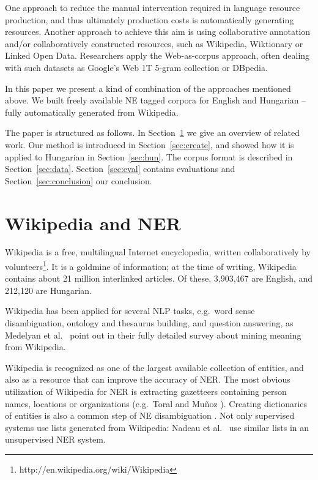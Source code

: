 \documentclass[11pt]{article}
\begin{document}
One approach to reduce the manual intervention required in language resource production, and thus ultimately production costs is automatically generating resources. Another approach to achieve this aim is using collaborative annotation and/or collaboratively constructed resources, such as Wikipedia, Wiktionary or Linked Open Data. Researchers apply the Web-as-corpus approach, often dealing with such datasets as Google's Web 1T 5-gram collection or DBpedia.  


In this paper we present a kind of combination of the approaches mentioned above. We built freely available NE tagged corpora for English and Hungarian -- fully automatically generated from Wikipedia. %

The paper is structured as follows. In Section~\ref{sec:related} we give an overview of related work. Our method is introduced in Section~\ref{sec:create}, and showed how it is applied to Hungarian in Section~\ref{sec:hun}. The corpus format is described in Section~\ref{sec:data}. Section~\ref{sec:eval} contains evaluations and Section~\ref{sec:conclusion} our conclusion.

\section{Wikipedia and NER}
\label{sec:related}

Wikipedia is a free, multilingual Internet encyclopedia, written collaboratively by volunteers\footnote{http://en.wikipedia.org/wiki/Wikipedia}. It is a goldmine of information; at the time of writing, Wikipedia contains about 21 million interlinked articles. Of these, 3,903,467 are English, and 212,120 are Hungarian. 

Wikipedia has been applied for several NLP tasks, e.g.~word sense disambiguation, ontology and thesaurus building, and question answering, as Medelyan et al.~ point out in their fully detailed survey about mining meaning from Wikipedia. 

Wikipedia is recognized as one of the largest available collection of entities, and also as a resource that can improve the accuracy of NER. The most obvious utilization of Wikipedia for NER is extracting gazetteers containing person names, locations or organizations (e.g.~Toral and Mu\~noz ). Creating dictionaries of entities is also a common step of NE disambiguation \cite{Bunescu:06,Cucerzan:07}. Not only supervised systems use lists generated from Wikipedia: Nadeau et al.~ use similar lists in an unsupervised NER system. 
\end{document}
